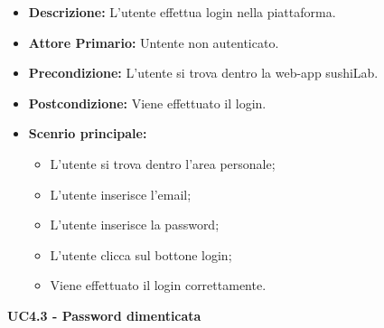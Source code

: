 \begin{itemize}
    \item \textbf{Descrizione:} L'utente effettua login nella piattaforma.
    \item \textbf{Attore Primario:} Untente non autenticato.
    \item \textbf{Precondizione:} L'utente si trova dentro la web-app sushiLab.
    \item \textbf{Postcondizione:} Viene effettuato il login.
    \item \textbf{Scenrio principale:}
    \begin{itemize}
        \item L'utente si trova dentro l'area personale;
        \item L'utente inserisce l'email;
        \item L'utente inserisce la password;
        \item L'utente clicca sul bottone login;
        \item Viene effettuato il login correttamente.
    \end{itemize}
\end{itemize}
\textbf{UC4.3 - Password dimenticata}
